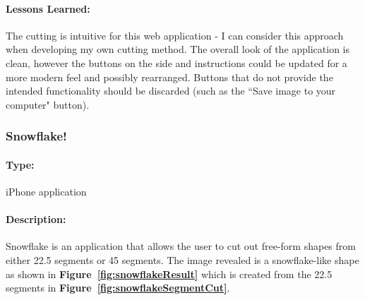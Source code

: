 \documentclass[11pt]{article}
\begin{document}
                \paragraph{Lessons Learned:}
                The cutting is intuitive for this web application - I can consider this approach when developing my own cutting method. The overall look of the application is clean, however the buttons on the side and instructions could be updated for a more modern feel and possibly rearranged. Buttons that do not provide the intended functionality should be discarded (such as the ``Save image to your computer" button).
                
            \subsubsection{Snowflake!}
            
                \paragraph{Type:} iPhone application %
            
                \paragraph{Description:}
                Snowflake is an application that allows the user to cut out free-form shapes from either 22.5\textdegree{} segments or 45\textdegree{} segments. The image revealed is a snowflake-like shape as shown in \textbf{Figure~\ref{fig:snowflakeResult}} which is created from the 22.5\textdegree{} segments in \textbf{Figure~\ref{fig:snowflakeSegmentCut}}. 
                    
\end{document}
